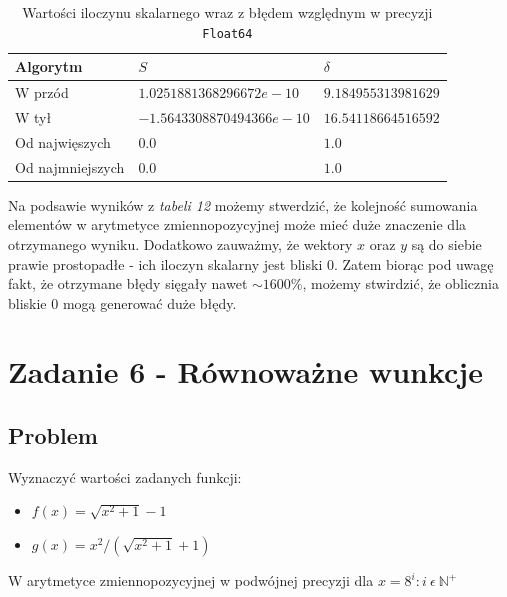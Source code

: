 \documentclass[12pt]{article}
\begin{document}
        \begin{table}[h!]
            \centering
            \begin{tabularx}{0.78\textwidth}{l l l}
                \hline
                Algorytm & $S$ & $\delta$ \\
                \hline
                W przód & $1.0251881368296672e-10$ & $9.184955313981629$ \\
                W tył & $-1.5643308870494366e-10$ & $16.54118664516592$ \\
                Od najwięszych & $0.0$ & $1.0$ \\
                Od najmniejszych & $0.0$ & $1.0$ \\
                \hline
            \end{tabularx}
            \caption{Wartości iloczynu skalarnego wraz z błędem względnym w precyzji \texttt{Float64}}
            \label{table:dot_prod_64}
        \end{table}

        \noindent Na podsawie wyników z \textit{tabeli 12} możemy stwerdzić, że kolejność sumowania elementów w arytmetyce
        zmiennopozycyjnej może mieć duże znaczenie dla otrzymanego wyniku.
        \newline
        Dodatkowo zauważmy, że wektory $x$ oraz $y$ są do siebie prawie prostopadłe - ich iloczyn skalarny jest bliski $0$.
        Zatem biorąc pod uwagę fakt, że otrzymane błędy sięgały nawet $\sim1600\%$, możemy stwirdzić,
        że oblicznia bliskie $0$ mogą generować duże błędy.

\newpage

\section*{Zadanie 6 - Równoważne wunkcje}
    \subsection*{Problem}
        Wyznaczyć wartości zadanych funkcji:
        \begin{itemize}
            \item $f(x) = \sqrt{x^2 + 1} - 1$
            \item $g(x) = x^2 / (\sqrt{x^2 + 1} + 1)$
        \end{itemize}
        W arytmetyce zmiennopozycyjnej w podwójnej precyzji dla $x = 8^i : i \: \epsilon \: \mathbb{N}^+$
        \newline
\end{document}
